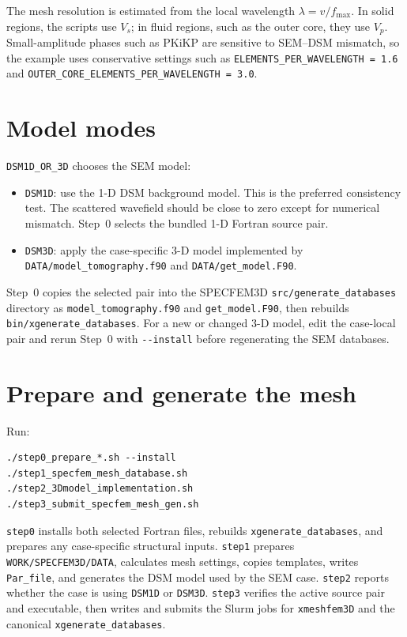 \documentclass[11pt,oneside]{book}
\DeclareRobustCommand{\code}[1]{\nolinkurl{#1}}
\begin{document}
The mesh resolution is estimated from the local wavelength
\(\lambda = v / f_{\max}\). In solid regions, the scripts use \(V_s\); in
fluid regions, such as the outer core, they use \(V_p\). Small-amplitude
phases such as PKiKP are sensitive to SEM--DSM mismatch, so the example uses
conservative settings such as \code{ELEMENTS_PER_WAVELENGTH = 1.6} and
\code{OUTER_CORE_ELEMENTS_PER_WAVELENGTH = 3.0}.

\section{Model modes}

\code{DSM1D_OR_3D} chooses the SEM model:
\begin{itemize}
  \item \code{DSM1D}: use the 1-D DSM background model. This is the preferred
  consistency test. The scattered wavefield should be close to zero except for
  numerical mismatch. Step~0 selects the bundled 1-D Fortran source pair.
  \item \code{DSM3D}: apply the case-specific 3-D model implemented by
  \code{DATA/model_tomography.f90} and \code{DATA/get_model.F90}.
\end{itemize}

Step~0 copies the selected pair into the SPECFEM3D
\code{src/generate_databases} directory as \code{model_tomography.f90} and
\code{get_model.F90}, then rebuilds \code{bin/xgenerate_databases}. For a new
or changed 3-D model, edit the case-local pair and rerun Step~0 with
\code{--install} before regenerating the SEM databases.

\section{Prepare and generate the mesh}

Run:
\begin{lstlisting}
./step0_prepare_*.sh --install
./step1_specfem_mesh_database.sh
./step2_3Dmodel_implementation.sh
./step3_submit_specfem_mesh_gen.sh
\end{lstlisting}
\code{step0} installs both selected Fortran files, rebuilds
\code{xgenerate_databases}, and prepares any case-specific structural inputs.
\code{step1} prepares \code{WORK/SPECFEM3D/DATA}, calculates mesh settings,
copies templates, writes \code{Par_file}, and generates the DSM model used by
the SEM case. \code{step2} reports whether the case is using \code{DSM1D} or
\code{DSM3D}. \code{step3} verifies the active source pair and executable,
then writes and submits the Slurm jobs for \code{xmeshfem3D} and the canonical
\code{xgenerate_databases}.
\end{document}
